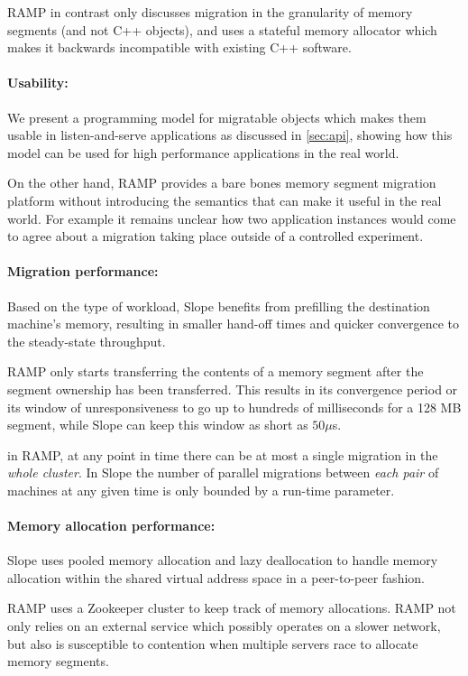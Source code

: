 RAMP in contrast only discusses migration in the granularity of memory segments
(and not C++ objects), and uses a stateful memory allocator which makes it
backwards incompatible with existing C++ software.

\paragraph{Usability:}
We present a programming model for migratable objects which makes them
usable in listen-and-serve applications as discussed in
\autoref{sec:api}, showing how this model can be used for high performance
applications in the real world.

On the other hand, RAMP provides a bare bones memory segment migration
platform without introducing the semantics that can make it useful in the real world.
For example it remains unclear how two application instances would come to
agree about a migration taking place outside of a controlled experiment.

\paragraph{Migration performance:}
Based on the type of workload, Slope benefits from prefilling the
destination machine's memory, resulting in smaller hand-off times and
quicker convergence to the steady-state throughput.


RAMP only starts transferring the contents of a memory segment after
the segment ownership has been transferred. This results in its
convergence period or its window of unresponsiveness to go up to hundreds
of milliseconds for a 128 MB segment, while Slope can keep this window as
short as $50\mu$s.

in RAMP, at any point in time there can be at most a single migration
in the \emph{whole cluster}. In Slope the number of parallel migrations
between \emph{each pair} of machines at any given time is only bounded by
a run-time parameter.


\paragraph{Memory allocation performance:}
Slope uses pooled memory allocation and lazy deallocation to handle
memory allocation within the shared virtual address space
in a peer-to-peer fashion.

RAMP uses a Zookeeper cluster to keep track of memory allocations.
RAMP not only relies on an external service which possibly
operates on a slower network, but also is susceptible to contention
when multiple servers race to allocate memory segments.



